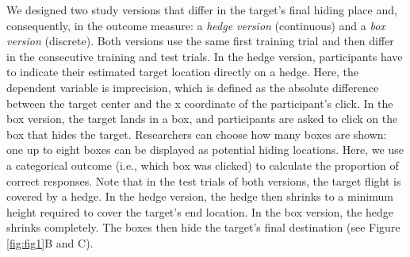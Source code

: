 \documentclass[
  man,floatsintext]{apa7}
\begin{document}
We designed two study versions that differ in the target's final hiding place and, consequently, in the outcome measure: a \emph{hedge version} (continuous) and a \emph{box version} (discrete).
Both versions use the same first training trial and then differ in the consecutive training and test trials.
In the hedge version, participants have to indicate their estimated target location directly on a hedge.
Here, the dependent variable is imprecision, which is defined as the absolute difference between the target center and the x coordinate of the participant's click.
In the box version, the target lands in a box, and participants are asked to click on the box that hides the target.
Researchers can choose how many boxes are shown: one up to eight boxes can be displayed as potential hiding locations.
Here, we use a categorical outcome (i.e., which box was clicked) to calculate the proportion of correct responses.
Note that in the test trials of both versions, the target flight is covered by a hedge.
In the hedge version, the hedge then shrinks to a minimum height required to cover the target's end location.
In the box version, the hedge shrinks completely.
The boxes then hide the target's final destination (see Figure \ref{fig:fig1}B and C).
\end{document}

